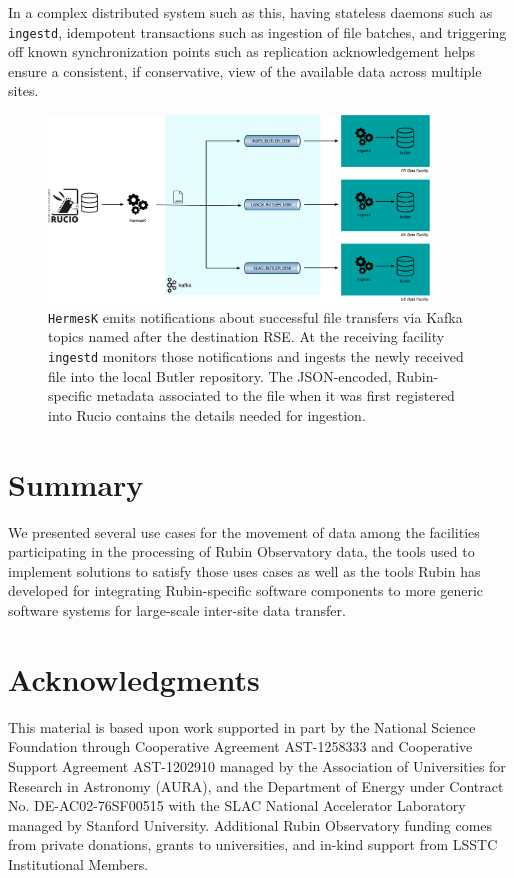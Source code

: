 \documentclass{webofc}
\begin{document}
In a complex distributed system such as this, having stateless daemons such as \texttt{ingestd}, idempotent transactions such as ingestion of file batches, and triggering off known synchronization points such as replication acknowledgement helps ensure a consistent, if conservative, view of the available data across multiple sites.

\begin{figure}[h]
\includegraphics[width=0.9\textwidth, center]{images/hermes_and_ingestd.pdf}
\caption{\texttt{HermesK} emits notifications about successful file transfers via Kafka topics named after the destination RSE. At the receiving facility \texttt{ingestd} monitors those notifications and ingests the newly received file into the local Butler repository. The JSON-encoded, Rubin-specific metadata associated to the file when it was first registered into Rucio contains the details needed for ingestion.}
\label{fig:kafka-control-plane}
\end{figure}


\section{Summary}
\label{summary}
We presented several use cases for the movement of data among the facilities participating in the processing of Rubin Observatory data, the tools used to implement solutions to satisfy those uses cases as well as the tools Rubin has developed for integrating Rubin-specific software components to more generic software systems for large-scale inter-site data transfer.

\section{Acknowledgments}

This material is based upon work supported in part by the National Science Foundation through Cooperative Agreement AST-1258333 and Cooperative Support Agreement AST-1202910 managed by the Association of Universities for Research in Astronomy (AURA), and the Department of Energy under Contract No. DE-AC02-76SF00515 with the SLAC National Accelerator Laboratory managed by Stanford University. Additional Rubin Observatory funding comes from private donations, grants to universities, and in-kind support from LSSTC Institutional Members.
\end{document}

